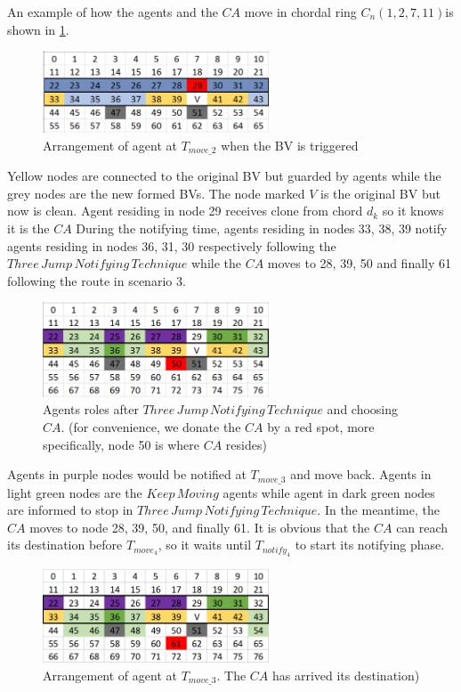 An example of how the agents and the $CA$ move in chordal ring $C_n(1, 2, 7, 11)$is shown in \ref{fig:T29}. 
\begin{figure}[H]
  \centering  
  \includegraphics[width=0.6\textwidth]{figures/T29.png}
  \caption{Arrangement of agent at $T_{move\_2}$ when the BV is triggered}\label{fig:T29}
\end{figure}

Yellow nodes are connected to the original BV but guarded by agents while the grey nodes are the new formed BVs. The node marked $V$ is the original BV but now is clean. Agent residing in node 29 receives clone from chord $d_k$ so it knows it is the $CA$ During the notifying time, agents residing in nodes 33, 38, 39 notify agents residing in nodes 36, 31, 30 respectively following the $Three\,Jump\,Notifying\,Technique$ while the $CA$ moves to 28, 39, 50 and finally 61 following the route in scenario 3.

\begin{figure}[H]
  \centering  
  \includegraphics[width=0.6\textwidth]{figures/T50.png}
  \caption{Agents roles after $Three\,Jump\,Notifying\,Technique$ and choosing $CA$. (for convenience, we donate the $CA$ by a red spot, more specifically, node 50 is where $CA$ resides)}\label{fig:T50}
\end{figure}

Agents in purple nodes would be notified at $T_{move\_3}$ and move back. Agents in light green nodes are the $Keep\,Moving$ agents while agent in dark green nodes are informed to stop in $Three\,Jump\,Notifying\,Technique$. In the meantime, the $CA$ moves to node 28, 39, 50, and finally 61. It is obvious that the $CA$ can reach its destination before $T_{move_4}$, so it waits until $T_{notify_4}$ to start its notifying phase. 

\begin{figure}[H]
  \centering  
  \includegraphics[width=0.6\textwidth]{figures/T611.png}
  \caption{Arrangement of agent at $T_{move\_3}$. The $CA$ has arrived its destination)}\label{fig:T611}
\end{figure}

